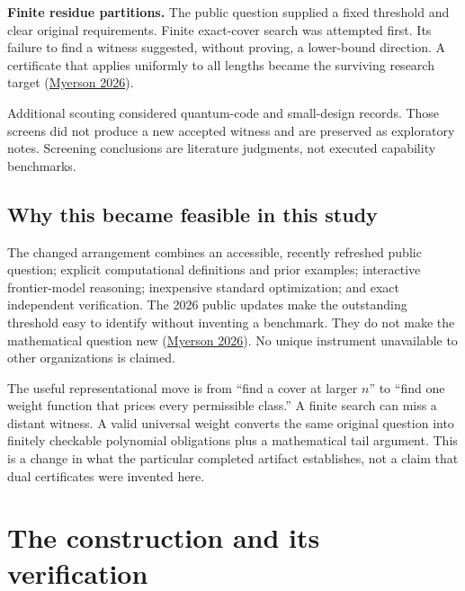 \documentclass[11pt,a4paper]{article}
\begin{document}
\textbf{Finite residue partitions.} The public question supplied a fixed
threshold and clear original requirements. Finite exact-cover search was
attempted first. Its failure to find a witness suggested, without
proving, a lower-bound direction. A certificate that applies uniformly
to all lengths became the surviving research target
(\protect\hyperlink{ref-myerson2026}{Myerson 2026}).

Additional scouting considered quantum-code and small-design records.
Those screens did not produce a new accepted witness and are preserved
as exploratory notes. Screening conclusions are literature judgments,
not executed capability benchmarks.


\hypertarget{why-this-became-feasible-in-this-study}{%
\subsection{Why this became feasible in this
study}\label{why-this-became-feasible-in-this-study}}

The changed arrangement combines an accessible, recently refreshed
public question; explicit computational definitions and prior examples;
interactive frontier-model reasoning; inexpensive standard optimization;
and exact independent verification. The 2026 public updates make the
outstanding threshold easy to identify without inventing a benchmark.
They do not make the mathematical question new
(\protect\hyperlink{ref-myerson2026}{Myerson 2026}). No unique
instrument unavailable to other organizations is claimed.

The useful representational move is from ``find a cover at larger
\(n\)'' to ``find one weight function that prices every permissible
class.'' A finite search can miss a distant witness. A valid universal
weight converts the same original question into finitely checkable
polynomial obligations plus a mathematical tail argument. This is a
change in what the particular completed artifact establishes, not a
claim that dual certificates were invented here.


\hypertarget{the-construction-and-its-verification}{%
\section{The construction and its
verification}\label{the-construction-and-its-verification}}
\end{document}
